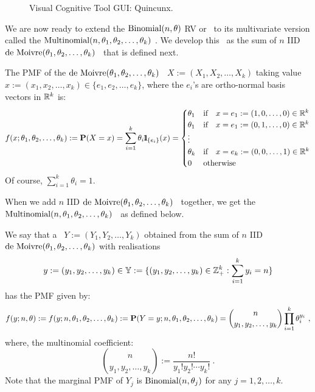 \begin{figure}[htpb]
\caption{Visual Cognitive Tool GUI: Quincunx.\label{F:guiMultinomialQuincunx}}
\centering   {}
\end{figure}

We are now ready to extend the $\mbox{{\rm Binomial}}(n,\theta)$ RV or \rv~to its multivariate version called the $\mbox{{\rm Multinomial}}(n,\theta_1,\theta_2,\ldots,\theta_k)$ \rv.  We develop this \rv~as the sum of $n$ IID $\mbox{{\rm de~Moivre}}(\theta_1,\theta_2,\ldots,\theta_k)$ \rv~that is defined next.

\begin{model}\label{M:deMoivreRVec}
The PMF of the $\mbox{{\rm de~Moivre}}(\theta_1,\theta_2,\ldots,\theta_k)$ \rv~$X := (X_1,X_2,\ldots,X_k)$ taking value $x := (x_1,x_2,\ldots,x_k) \in \{e_1,e_2,\ldots,e_k\}$, where the $e_i$'s are ortho-normal basis vectors in $\mathbb{R}^k$ is:
\[
f(x;\theta_1,\theta_2,\ldots,\theta_k) := \mathbf{P}(X=x) = \sum_{i=1}^k \theta_i {1}\mspace{-11 mu}{1}_{\{e_i\}}(x) =
\begin{cases}
\theta_1 & \text{if} \quad x=e_1:=(1,0,\ldots,0) \in \mathbb{R}^k \\
\theta_1 & \text{if} \quad x=e_1:=(0,1,\ldots,0) \in  \mathbb{R}^k \\
\vdots \\
\theta_k & \text{if} \quad x=e_k:=(0,0,\ldots,1) \in  \mathbb{R}^k \\
0 & \text{otherwise}
\end{cases}
\]
Of course, $\sum_{i=1}^k \theta_i = 1$.
\end{model}

When we add $n$ IID $\mbox{{\rm de~Moivre}}(\theta_1,\theta_2,\ldots,\theta_k)$ \rv~together, we get the $\mbox{{\rm Multinomial}}(n,\theta_1,\theta_2,\ldots,\theta_k)$ \rv~as defined below.

\begin{model}\label{M:Multinomial}
We say that a \rv~$Y:=(Y_1,Y_2,\ldots,Y_k)$ obtained from the sum of $n$ IID $\mbox{{\rm de~Moivre}}(\theta_1,\theta_2,\ldots,\theta_k)$  with realisations
$$y:=(y_1,y_2,\ldots,y_k) \in \mathbb{Y}:= \{(y_1,y_2,\ldots,y_k) \in \mathbb{Z}_+^k : \sum_{i=1}^k y_i = n\}$$ has the PMF given by:
\[
f(y;n,\theta) := f(y;n,\theta_1,\theta_2,\ldots,\theta_k) := \mathbf{P}(Y=y;n,\theta_1,\theta_2,\ldots,\theta_k) = \binom{n}{y_1,y_2,\ldots,y_k} \prod_{i=1}^k \theta_i^{y_i} \ ,
\]
where, the multinomial coefficient:
\[
 \binom{n}{y_1,y_2,\ldots,y_k} := \frac{n!}{y_1! y_2! \cdots y_k!} \ .
\]
Note that the marginal PMF of $Y_j$ is $\mbox{{\rm Binomial}}(n,\theta_j)$ for any $j=1,2,\ldots,k$.
\end{model}

